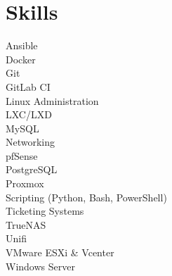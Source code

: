 \documentclass[]{deedy-resume-reversed}
\begin{document}
\begin{minipage}[t]{0.39\textwidth}
\section{Skills}
Ansible \\
Docker \\
Git \\
GitLab CI \\
Linux Administration \\
LXC/LXD \\
MySQL \\
Networking \\
pfSense \\
PostgreSQL \\
Proxmox \\
Scripting (Python, Bash, PowerShell) \\
Ticketing Systems \\
TrueNAS \\
Unifi \\
VMware ESXi \& Vcenter \\
Windows Server \\

\sectionsep






\end{minipage}
\end{document}

